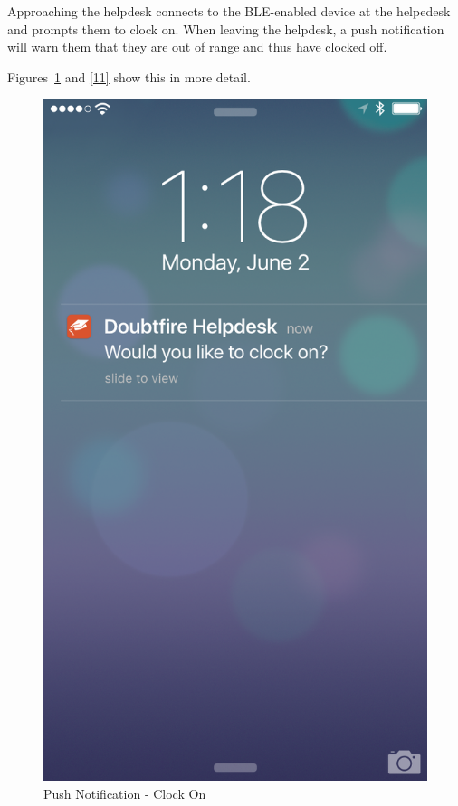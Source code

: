 \documentclass[a4paper,12pt]{article}
\begin{document}
Approaching the helpdesk connects to the BLE-enabled device at the
helpedesk and prompts them to clock on. When leaving the helpdesk, a push notification will warn them that they
are out of range and thus have clocked off.

Figures~\ref{10} and \ref{11} show this in more detail.

\begin{figure}[p]
\centering
\includegraphics[scale=0.5]{30a3aff891.png}
\caption{Push Notification - Clock On}
\label{10}
\end{figure}
\end{document}
